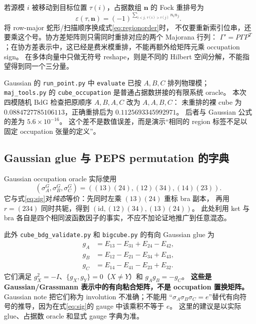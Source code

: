 \documentclass[11pt]{article}
\newcommand{\id}{\mathrm{id}}
\newcommand{\code}[1]{\texttt{\small #1}}
\newcommand{\eps}{\varepsilon}
\begin{document}
若源模 $i$ 被移动到目标位置 $\tau(i)$，占据数组 $\mathbf n$ 的 Fock 重排号为
\begin{equation}
 \eps(\tau,\mathbf n)=(-1)^{\sum_{i<j,\,\tau(i)>\tau(j)}n_i n_j}.
 \label{eq:koszul}
\end{equation}
将 row-major 蛇形/扫描顺序换成式\eqref{eq:regionorder}时，
不仅要重新索引位串，还要乘这个号。协方差矩阵则只需同时重排对应的两个 Majorana 行列：
$\Gamma'=P\Gamma P^T$；在协方差表示中，这已经是费米模重排，不能再额外给矩阵元乘 occupation sign。
在多体向量中只做无符号 reshape，则是不同的 Hilbert 空间分解，不能指望得到同一个三分量。

Gaussian 的 \code{run\_point.py} 中 \code{evaluate} 已按 $A,B,C$ 排列物理模；
\code{maj\_tools.py} 的 \code{cube\_occupation} 是普通占据数拼接的有限系统 oracle。
本次四模随机 BdG 检查把原顺序 $A,B,A,C$ 改为 $A,A,B,C$：
未重排的裸 cube 为 $0.0884727785106113$，正确重排后为 $0.1125693345992971$。
后者与 Gaussian 公式的差为 $5.6\times10^{-16}$。
这个差不是数值误差，而是演示“相同的 region 标签不足以固定 occupation 张量的定义”。

\subsection{Gaussian glue 与 PEPS permutation 的字典}

Gaussian occupation oracle 实际使用
\begin{equation}
 (\sigma_A^{G},\sigma_B^{G},\sigma_C^{G})
 =((13)(24),(12)(34),(14)(23)).
\end{equation}
它与式\eqref{eq:sig}对\emph{纯态}等价：先同时左乘 $(13)(24)$ 重标 bra 副本，
再用 $r=(234)$ 同时共轭，得到 $(\id,(12)(34),(13)(24))$。
此处利用 ket 与 bra 各自是四个相同波函数因子的事实，不应不加论证地推广到任意混态。

此外 \code{cube\_bdg\_validate.py} 和 \code{bigcube.py} 的有向 Gaussian glue 为
\begin{align}
 g_A&=E_{13}-E_{31}+E_{24}-E_{42},\nonumber\\
 g_B&=E_{12}-E_{21}-E_{34}+E_{43},\nonumber\\
 g_C&=E_{14}-E_{41}-E_{23}+E_{32}.\label{eq:gmat}
\end{align}
它们满足 $g_X^2=-I$、$\{g_X,g_Y\}=0$（$X\ne Y$）和 $g_Ag_B=-g_C$。
\textbf{这些是 Gaussian/Grassmann 表示中的有向粘合矩阵，不是 occupation 置换矩阵。}
Gaussian note 把它们称为 involution 不准确；不能用
“$\sigma_A\sigma_B\sigma_C=e$”替代有向符号的推导，因为在式\eqref{eq:sig}的 gauge 中该乘积不等于 $e$。
这里的建议是以实际 glue、占据数 oracle 和显式 gauge 字典为准。
\end{document}

